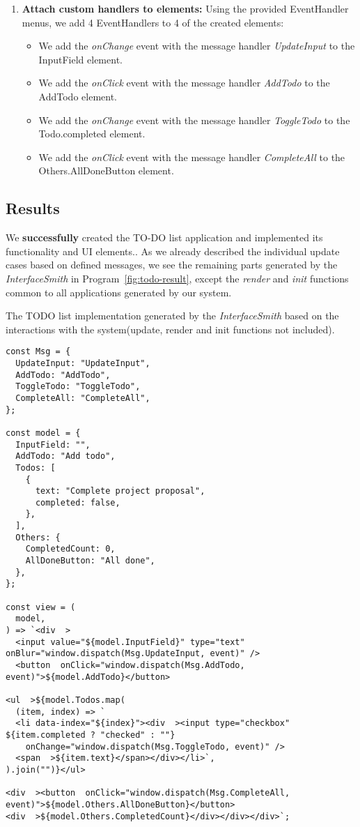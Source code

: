 \begin{enumerate}
\begin{itemize}
\end{itemize}

\item \textbf{Attach custom handlers to elements:} Using the provided EventHandler menus, we add 4 EventHandlers to 4 of the created elements:
\begin{itemize}
	\item We add the \emph{onChange} event with the message handler \emph{UpdateInput} to the InputField element.
	\item We add the \emph{onClick} event with the message handler \emph{AddTodo} to the AddTodo element.
	\item We add the \emph{onChange} event with the message handler \emph{ToggleTodo} to the Todo.completed element.
	\item We add the \emph{onClick} event with the message handler \emph{CompleteAll} to the Others.AllDoneButton element.
\end{itemize}
\end{enumerate}
\medskip
\subsection{Results}
We \textbf{successfully} created the TO-DO list application and implemented its functionality and UI elements..
As we already described the individual update cases based on defined messages, we see the remaining parts generated by the \emph{InterfaceSmith} in Program~\ref{fig:todo-result},
except the \emph{render} and \emph{init} functions common to all applications generated by our system.

\begin{listing}[p]
	\caption {The TODO list implementation generated by the \emph{InterfaceSmith} based on the interactions with the system(update, render and init functions not included).}
	\label{fig:todo-result}
	\begin{lstlisting}
const Msg = {
  UpdateInput: "UpdateInput",
  AddTodo: "AddTodo",
  ToggleTodo: "ToggleTodo",
  CompleteAll: "CompleteAll",
};

const model = {
  InputField: "",
  AddTodo: "Add todo",
  Todos: [
    {
      text: "Complete project proposal",
      completed: false,
    },
  ],
  Others: {
    CompletedCount: 0,
    AllDoneButton: "All done",
  },
};

const view = (
  model,
) => `<div  >
  <input value="${model.InputField}" type="text" onBlur="window.dispatch(Msg.UpdateInput, event)" />
  <button  onClick="window.dispatch(Msg.AddTodo, event)">${model.AddTodo}</button>

<ul  >${model.Todos.map(
  (item, index) => `
  <li data-index="${index}"><div  ><input type="checkbox" ${item.completed ? "checked" : ""} 
    onChange="window.dispatch(Msg.ToggleTodo, event)" />
  <span  >${item.text}</span></div></li>`,
).join("")}</ul>

<div  ><button  onClick="window.dispatch(Msg.CompleteAll, event)">${model.Others.AllDoneButton}</button>
<div  >${model.Others.CompletedCount}</div></div></div>`;
\end{lstlisting}
\end{listing}

